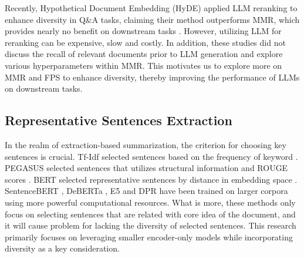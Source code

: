 Recently, Hypothetical Document Embedding (HyDE) applied LLM reranking to enhance diversity in Q\&A tasks, claiming their method outperforms MMR, which provides nearly no benefit on downstream tasks \cite{eibich2024aragogadvancedragoutput, pickett2024betterragusingrelevant}. However, utilizing LLM for reranking can be expensive, slow and costly. In addition, these studies did not discuss the recall of relevant documents prior to LLM generation and explore various hyperparameters within MMR. This motivates us to explore more on MMR and FPS to enhance diversity, thereby improving the performance of LLMs on downstream tasks.

\subsection{Representative Sentences Extraction}
In the realm of extraction-based summarization, the criterion for choosing key sentences is crucial. Tf-Idf selected sentences based on the frequency of keyword \cite{liang-etal-2021-improving}. PEGASUS selected sentences that utilizes structural information and ROUGE scores \cite{zhang2020pegasus}. BERT selected representative sentences by distance in embedding space \cite{devlin2019bert}. SentenceBERT \cite{reimers2019sentencebert}, DeBERTa \cite{he2021debertadecodingenhancedbertdisentangled}, E5 \cite{wang2024textembeddingsweaklysupervisedcontrastive} and DPR \cite{karpukhin2020densepassageretrievalopendomain} have been trained on larger corpora using more powerful computational resources. What is more, these methods only focus on selecting sentences that are related with core idea of the document, and it will cause problem for lacking the diversity of selected sentences. This research primarily focuses on leveraging smaller encoder-only models while incorporating diversity as a key consideration.